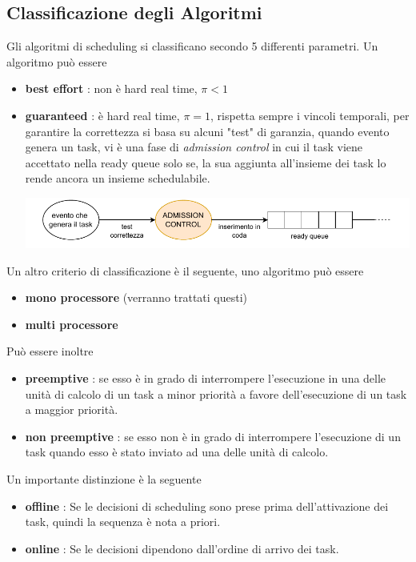 \documentclass[10pt, letterpaper]{report}
\begin{document}
\subsection{Classificazione degli Algoritmi}
Gli algoritmi di scheduling si classificano secondo 5 differenti parametri. Un algoritmo può essere\begin{itemize}
    \item \textbf{best effort} : non è hard real time, $\pi<1$
    \item \textbf{guaranteed} : è hard real time, $\pi=1$, rispetta sempre i vincoli temporali, per garantire 
    la correttezza si basa su alcuni "test" di garanzia, quando evento genera un task, vi è una fase di 
    \textit{admission control} in cui il task viene accettato nella ready queue solo se, la sua aggiunta 
    all'insieme dei task lo rende ancora un insieme schedulabile.\begin{center}
        \includegraphics[width=1\textwidth ]{images/admissionControl.pdf}
    \end{center}
\end{itemize}
Un altro criterio di classificazione è il seguente, uno algoritmo può essere\begin{itemize}
    \item \textbf{mono processore} (verranno trattati questi)
    \item \textbf{multi processore}
\end{itemize}
Può essere inoltre \begin{itemize}
    \item \textbf{preemptive} : se esso è in grado di interrompere l'esecuzione in una delle unità di
    calcolo di un task a minor priorità a favore dell'esecuzione di un task a maggior
    priorità.
    \item \textbf{non preemptive} :  se esso non è in grado di interrompere l'esecuzione di un task
    quando esso è stato inviato ad una delle unità di calcolo.
\end{itemize}
Un importante distinzione è la seguente\begin{itemize}
    \item \textbf{offline} : Se le decisioni di scheduling sono prese prima dell'attivazione dei task, 
    quindi la sequenza è nota a priori. 
    \item \textbf{online} : Se le decisioni dipendono dall'ordine di arrivo dei task. 
\end{itemize}
\end{document}
